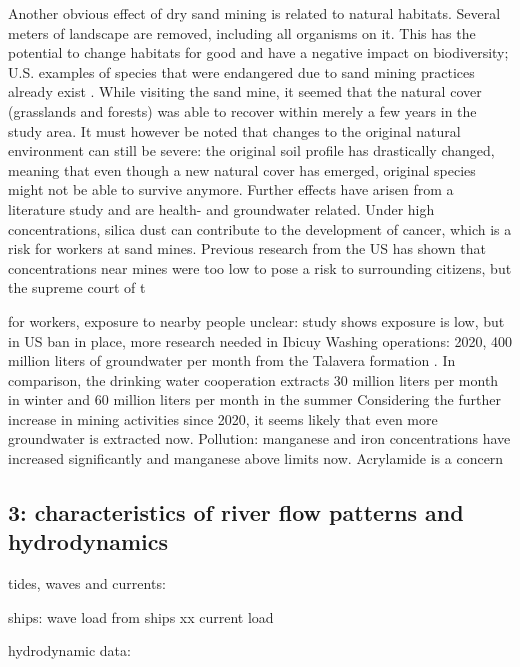 Another obvious effect of dry sand mining is related to natural habitats. Several meters of landscape are removed, including all organisms on it. This has the potential to change habitats for good and have a negative impact on biodiversity; U.S. examples of species that were endangered due to sand mining practices already exist \autocite{centerforbiologicaldiversityLegalInterventionLaunched2025}. While visiting the sand mine, it seemed that the natural cover (grasslands and forests) was able to recover within merely a few years in the study area. It must however be noted that changes to the original natural environment can still be severe: the original soil profile has drastically changed, meaning that even though a new natural cover has emerged, original species might not be able to survive anymore. Further effects have arisen from a literature study and are health- and groundwater related. Under high concentrations, silica dust can contribute to the development of cancer, which is a risk for workers at sand mines. Previous research from the US has shown that concentrations near mines were too low to pose a risk to surrounding citizens, but the supreme court of t


for workers, exposure to nearby people unclear: study shows exposure is low, but in US ban in place, more research needed in Ibicuy
Washing operations: 2020, 400 million liters of groundwater per month from the Talavera formation . In comparison, the drinking water cooperation extracts 30 million liters per month in winter and 60 million liters per month in the summer  Considering the further increase in mining activities since 2020, it seems likely that even more groundwater is extracted now. 
Pollution: manganese and iron concentrations have increased significantly and manganese above limits now. Acrylamide is a concern 

\subsection{3: characteristics of river flow patterns and hydrodynamics}
tides, waves and currents: 

ships: wave load from ships xx
current load

hydrodynamic data: 


